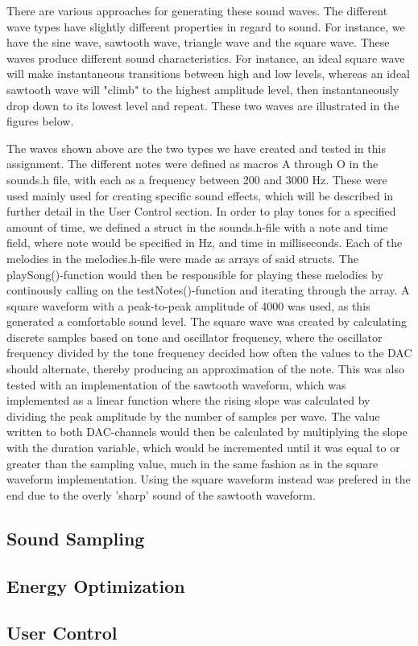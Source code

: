 There are various approaches for generating these sound waves. The different wave types have slightly different properties in regard to sound. For instance, we have the sine wave, sawtooth wave, triangle wave and the square wave. These waves produce different sound characteristics. For instance, an ideal square wave will make instantaneous transitions between high and low levels, whereas an ideal sawtooth wave will "climb" to the highest amplitude level, then instantaneously drop down to its lowest level and repeat. These two waves are illustrated in the figures below.




The waves shown above are the two types we have created and tested in this assignment. The different notes were defined as macros A through O in the sounds.h file, with each as a frequency between 200 and 3000 Hz. These were used mainly used for creating specific sound effects, which will be described in further detail in the User Control section.
	In order to play tones for a specified amount of time, we defined a struct in the sounds.h-file with a note and time field, where note would be specified in Hz, and time in milliseconds. Each of the melodies in the melodies.h-file were made as arrays of said structs. The playSong()-function would then be responsible for playing these melodies by continously calling on the testNotes()-function and iterating through the array. A square waveform with a peak-to-peak amplitude of 4000 was used, as this generated a comfortable sound level. The square wave was created by calculating discrete samples based on tone and oscillator frequency, where the oscillator frequency divided by the tone frequency decided how often the values to the DAC should alternate, thereby producing an approximation of the note. This was also tested with an implementation of the sawtooth waveform, which was implemented as a linear function where the rising slope was calculated by dividing the peak amplitude by the number of samples per wave. The value written to both DAC-channels would then be calculated by multiplying the slope with the duration variable, which would be incremented until it was equal to or greater than the sampling value, much in the same fashion as in the square waveform implementation. Using the square waveform instead was prefered in the end due to the overly 'sharp' sound of the sawtooth waveform.

\subsection{Sound Sampling}



\subsection{Energy Optimization}




\subsection{User Control}
